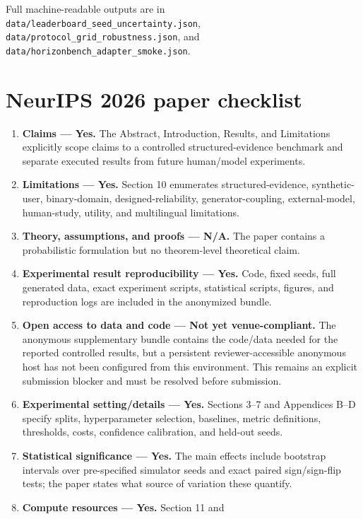 Full machine-readable outputs are in
\texttt{data/leaderboard\_seed\_uncertainty.json},
\texttt{data/protocol\_grid\_robustness.json}, and
\texttt{data/horizonbench\_adapter\_smoke.json}.

\section{NeurIPS 2026 paper
checklist}\label{neurips-2026-paper-checklist}

\begin{enumerate}
\def\labelenumi{\arabic{enumi}.}
\tightlist
\item
  \textbf{Claims --- Yes.} The Abstract, Introduction, Results, and
  Limitations explicitly scope claims to a controlled
  structured-evidence benchmark and separate executed results from
  future human/model experiments.
\item
  \textbf{Limitations --- Yes.} Section 10 enumerates
  structured-evidence, synthetic-user, binary-domain,
  designed-reliability, generator-coupling, external-model, human-study,
  utility, and multilingual limitations.
\item
  \textbf{Theory, assumptions, and proofs --- N/A.} The paper contains a
  probabilistic formulation but no theorem-level theoretical claim.
\item
  \textbf{Experimental result reproducibility --- Yes.} Code, fixed
  seeds, full generated data, exact experiment scripts, statistical
  scripts, figures, and reproduction logs are included in the anonymized
  bundle.
\item
  \textbf{Open access to data and code --- Not yet venue-compliant.} The
  anonymous supplementary bundle contains the code/data needed for the
  reported controlled results, but a persistent reviewer-accessible
  anonymous host has not been configured from this environment. This
  remains an explicit submission blocker and must be resolved before
  submission.
\item
  \textbf{Experimental setting/details --- Yes.} Sections 3--7 and
  Appendices B--D specify splits, hyperparameter selection, baselines,
  metric definitions, thresholds, costs, confidence calibration, and
  held-out seeds.
\item
  \textbf{Statistical significance --- Yes.} The main effects include
  bootstrap intervals over pre-specified simulator seeds and exact
  paired sign/sign-flip tests; the paper states what source of variation
  these quantify.
\item
  \textbf{Compute resources --- Yes.} Section 11 and

\end{enumerate}
